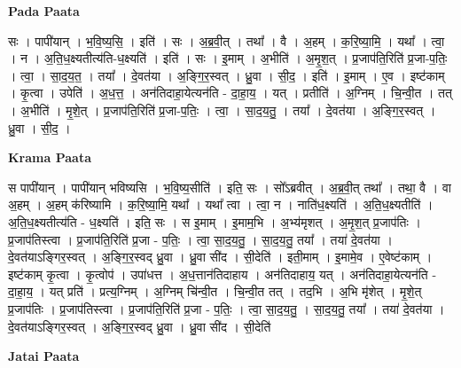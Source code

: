 \documentclass[17pt]{extarticle}
\begin{document}
\textbf{Pada Paata} \newline

सः । पापी॑यान् । भ॒वि॒ष्य॒सि॒ । इति॑ । सः । अ॒ब्र॒वी॒त् । तथा᳚ । वै । अ॒हम् । क॒रि॒ष्या॒मि॒ । यथा᳚ । त्वा॒ । न । अ॒ति॒ध॒क्ष्यतीत्य॑ति-ध॒क्ष्यति॑ । इति॑ । सः । इ॒माम् । अ॒भीति॑ । अ॒मृ॒श॒त् । प्र॒जाप॑ति॒रिति॑ प्र॒जा-प॒तिः॒ । त्वा॒ । सा॒द॒य॒त॒ । तया᳚ । दे॒वत॑या । अ॒ङ्गि॒र॒स्वत् । ध्रु॒वा । सी॒द॒ । इति॑ । इ॒माम् । ए॒व । इष्ट॑काम् । कृ॒त्वा । उपेति॑ । अ॒ध॒त्त॒ । अन॑तिदाहा॒येत्यन॑ति - दा॒हा॒य॒ । यत् । प्रतीति॑ । अ॒ग्निम् । चि॒न्वी॒त । तत् । अ॒भीति॑ । मृ॒शे॒त् । प्र॒जाप॑ति॒रिति॑ प्र॒जा-प॒तिः॒ । त्वा॒ । सा॒द॒य॒तु॒ । तया᳚ । दे॒वत॑या । अ॒ङ्गि॒र॒स्वत् । ध्रु॒वा । सी॒द॒ ।  \newline


\textbf{Krama Paata} \newline

स पापी॑यान् । पापी॑यान् भविष्यसि । भ॒वि॒ष्य॒सीति॑ । इति॒ सः । सो᳚ऽब्रवीत् । अ॒ब्र॒वी॒त् तथा᳚ । तथा॒ वै । वा अ॒हम् । अ॒हम् क॑रिष्यामि । क॒रि॒ष्या॒मि॒ यथा᳚ । यथा᳚ त्वा । त्वा॒ न । नाति॑ध॒क्ष्यति॑ । अ॒ति॒ध॒क्ष्यतीति॑ । अ॒ति॒ध॒क्ष्यतीत्य॑ति - ध॒क्ष्यति॑ । इति॒ सः । स इ॒माम् । इ॒माम॒भि । अ॒भ्य॑मृशत् । अ॒मृ॒श॒त् प्र॒जाप॑तिः । प्र॒जाप॑तिस्त्वा । प्र॒जाप॑ति॒रिति॑ प्र॒जा - प॒तिः॒ । त्वा॒ सा॒द॒य॒तु॒ । सा॒द॒य॒तु॒ तया᳚ । तया॑ दे॒वत॑या । दे॒वत॑याऽङ्गिर॒स्वत् । 
अ॒ङ्गि॒र॒स्वद् ध्रु॒वा । ध्रु॒वा सी॑द । सी॒देति॑ । इती॒माम् । इ॒मामे॒व । ए॒वेष्ट॑काम् । इष्ट॑काम् कृ॒त्वा । कृ॒त्वोप॑ । उपा॑धत्त । अ॒ध॒त्तान॑तिदाहाय । अन॑तिदाहाय॒ यत् । अन॑तिदाहा॒येत्यन॑ति - दा॒हा॒य॒ । यत् प्रति॑ । प्रत्य॒ग्निम् । अ॒ग्निम् चि॑न्वी॒त । चि॒न्वी॒त तत् । तद॒भि । अ॒भि मृ॑शेत् । मृ॒शे॒त् प्र॒जाप॑तिः । प्र॒जाप॑तिस्त्वा । प्र॒जाप॑ति॒रिति॑ प्र॒जा - प॒तिः॒ । त्वा॒ सा॒द॒य॒तु॒ । सा॒द॒य॒तु॒ तया᳚ । तया॑ दे॒वत॑या । दे॒वत॑याऽङ्गिर॒स्वत् । अ॒ङ्गि॒र॒स्वद् ध्रु॒वा । ध्रु॒वा सी॑द । सी॒देति॑ \newline

\textbf{Jatai Paata} \newline
\end{document}
